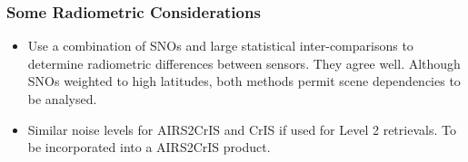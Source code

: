 \documentclass[10pt,t]{beamer}
\begin{document}
\begin{frame}
  \frametitle{Some Radiometric Considerations}
  \begin{itemize}
  \item Use a combination of SNOs and large statistical inter-comparisons to determine radiometric differences between sensors. They agree well. Although SNOs weighted to high latitudes, both methods permit scene dependencies to be analysed.
    \item Similar noise levels for AIRS2CrIS and CrIS if used for Level 2 retrievals.  To be incorporated into a AIRS2CrIS product.
  \end{itemize}
  
\end{frame}
\end{document}
